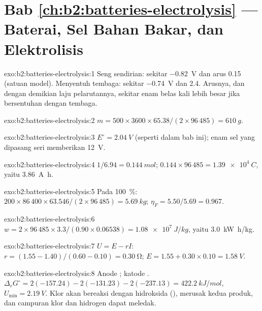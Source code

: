 \section*{Bab \ref{ch:b2:batteries-electrolysis} --- Baterai, Sel Bahan Bakar, dan Elektrolisis}

\begin{solution}{exo:b2:batteries-electrolysis:1}
Seng sendirian: sekitar \qty{-0.82}{V} dan arus 0.15 (satuan model).
Menyentuh tembaga: sekitar \qty{-0.74}{V} dan 2.4. Arusnya, dan dengan
demikian laju pelarutannya, sekitar enam belas kali lebih besar jika
bersentuhan dengan tembaga.
\end{solution}

\begin{solution}{exo:b2:batteries-electrolysis:2}
$m = 500 \times 3600 \times 65.38/(2 \times 96\,485) = \qty{610}{g}$.
\end{solution}

\begin{solution}{exo:b2:batteries-electrolysis:3}
$E^\circ = \qty{2.04}{V}$ (seperti dalam bab ini); enam sel yang dipasang
seri memberikan \qty{12}{V}.
\end{solution}

\begin{solution}{exo:b2:batteries-electrolysis:4}
$1/6.94 = \qty{0.144}{mol}$; $0.144 \times 96\,485 = \qty{1.39e4}{C}$, yaitu
\qty{3.86}{A.h}.
\end{solution}

\begin{solution}{exo:b2:batteries-electrolysis:5}
Pada 100~\%: $200 \times 86\,400 \times 63.546/(2 \times 96\,485) = \qty{5.69}{kg}$;
$\eta_F = 5.50/5.69 = 0.967$.
\end{solution}

\begin{solution}{exo:b2:batteries-electrolysis:6}
$w = 2 \times 96\,485 \times 3.3/(0.90 \times 0.06538) = \qty{1.08e7}{J/kg}$,
yaitu \qty{3.0}{kW.h/kg}.
\end{solution}

\begin{solution}{exo:b2:batteries-electrolysis:7}
$U = E - rI$: $r = (1.55 - 1.40)/(0.60 - 0.10) = \qty{0.30}{\ohm}$; $E = 1.55 + 0.30
\times 0.10 = \qty{1.58}{V}$.
\end{solution}

\begin{solution}{exo:b2:batteries-electrolysis:8}
Anode ; katode . $\Delta_r G^\circ =
2(-157.24) - 2(-131.23) - 2(-237.13) = \qty{422.2}{kJ/mol}$, $U_{\min} =
\qty{2.19}{V}$. Klor akan bereaksi dengan hidroksida
(), merusak kedua produk, dan campuran
klor dan hidrogen dapat meledak.
\end{solution}

